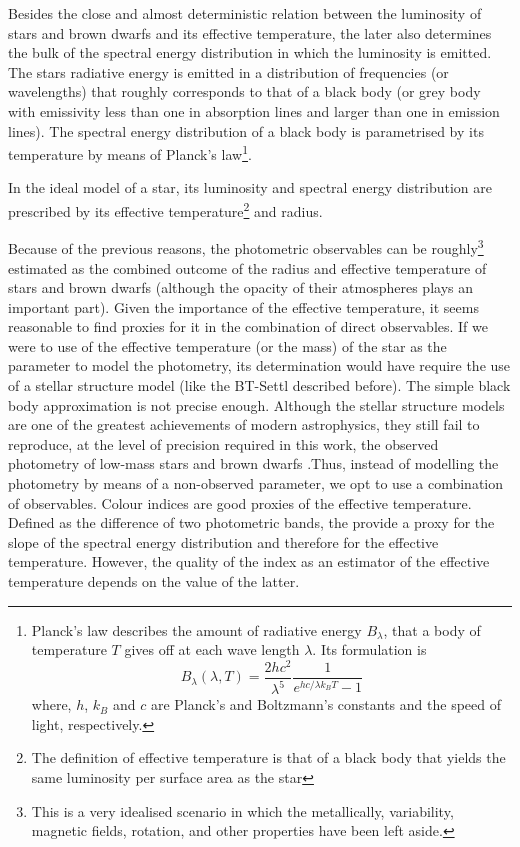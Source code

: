 Besides the close and almost deterministic relation between the luminosity of stars and brown dwarfs and its effective temperature, the later also determines the bulk of the spectral energy distribution in which the luminosity is emitted. The stars radiative energy is emitted in a distribution of frequencies (or wavelengths) that roughly corresponds to that of a black body (or grey body with emissivity less than one in absorption lines and larger than one in emission lines). The spectral energy distribution of a black body is parametrised by its temperature by means of Planck's law\footnote{
Planck's law describes the amount of radiative energy $B_{\lambda}$, that a body of temperature $T$ gives off at each wave length $\lambda$. Its formulation is 
\begin{equation}
B_\lambda (\lambda,T)=\frac{2hc^2}{\lambda^5}\frac{1}{e^{h c /\lambda k_B T}-1}\nonumber
\end{equation}
where, $h$, $k_B$ and $c$ are Planck's and Boltzmann's constants and the speed of light, respectively. 
}. 

In the ideal model of a star, its luminosity and spectral energy distribution are prescribed by its effective temperature\footnote{The definition of effective temperature is that of a black body that yields the same luminosity per surface area as the star} and radius. 

Because of the previous reasons, the photometric observables can be roughly\footnote{This is a very idealised scenario in which the metallically, variability, magnetic fields, rotation, and other properties have been left aside.} estimated as the combined outcome of the radius and effective temperature of stars and brown dwarfs (although the opacity of their atmospheres plays an important part). Given the importance of the effective temperature, it seems reasonable to find proxies for it in the combination of direct observables. If we were to use of the effective temperature (or the mass) of the star as the parameter to model the photometry, its determination would have require the use of a stellar structure model (like the BT-Settl described before). The simple black body approximation is not precise enough. Although the stellar structure models are one of the greatest achievements of modern astrophysics, they still fail to reproduce, at the level of precision required in this work, the observed photometry of low-mass stars and brown dwarfs \cite[see Fig. \ref{fig:HDRvsCMD}, and for example ][]{Bouy2015}.Thus, instead of modelling the photometry by means of a non-observed parameter, we opt to use a combination of observables. Colour indices are good proxies of the effective temperature. Defined as the difference of two photometric bands, the provide a proxy for the slope of the spectral energy distribution and therefore for the effective temperature.  However, the quality of the index as an estimator of the effective temperature depends on the value of the latter. 

